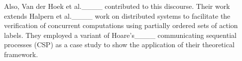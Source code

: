 Also, Van der Hoek et al.____ contributed to this discourse. Their work extends Halpern et al.____ work on distributed systems to facilitate the verification of concurrent computations using partially ordered sets of action labels. They employed a variant of Hoare's____ communicating sequential processes (CSP) as a case study to show the application of their theoretical framework.